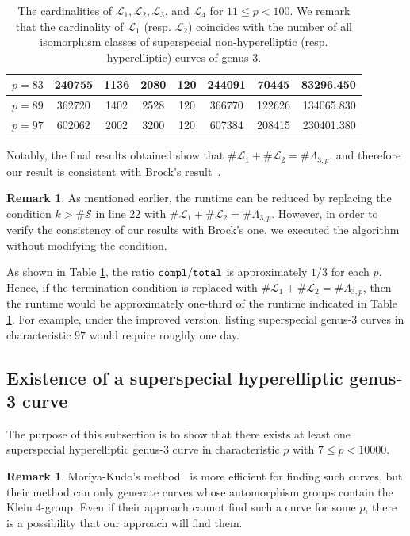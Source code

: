 \documentclass{amsart}
\theoremstyle{definition}
\newtheorem{Rmk}[Def]{Remark}
\theoremstyle{plain}
\begin{document}
\begin{table}[htbp]
\begin{tabular}{c||c|c|c|c||c|c||r}
    $p=83$ & 240755 & 1136 & 2080 & 120 & 244091&  70445 & 83296.450\\\hline
    $p=89$ & 362720 & 1402 & 2528 & 120 & 366770 & 122626 & 134065.830\\\hline
    $p=97$ & 602062 & 2002 & 3200 & 120 & 607384 & 208415 & 230401.380
    \end{tabular}\vspace{3mm}
    \caption{The cardinalities of $\mathcal{L}_1,\mathcal{L}_2,\mathcal{L}_3$, and $\mathcal{L}_4$ for $11 \leq p < 100$. We remark that the cardinality of $\mathcal{L}_1$ (resp. $\mathcal{L}_2$) coincides with the number of all isomorphism classes of superspecial non-hyperelliptic (resp. hyperelliptic) curves of genus 3.}\label{enumerate}
\end{table}

Notably, the final results obtained show that $\#\mathcal{L}_1 + \#\mathcal{L}_2 = \#\Lambda_{3,p}$, and therefore our result is consistent with Brock's result~\cite[Theorem 3.10]{Brock}.
\begin{Rmk}\label{later}
As mentioned earlier, the runtime can be reduced by replacing the condition $k > \#\mathcal{S}$ in line 22 with $\#\mathcal{L}_1 + \#\mathcal{L}_2 = \#\Lambda_{3,p}$.
However, in order to verify the consistency of our results with Brock's one, we executed the algorithm without modifying the condition.
\end{Rmk}

\noindent As shown in Table \ref{enumerate}, the ratio ${\tt compl}/{\tt total}$ is approximately $1/3$ for each $p$.
Hence, if the termination condition is replaced with  $\#\mathcal{L}_1 + \#\mathcal{L}_2 = \#\Lambda_{3,p}$, then the runtime would be approximately one-third of the runtime indicated in Table \ref{enumerate}.
For example, under the improved version, listing superspecial genus-3 curves in characteristic $97$ would require roughly one day.

\subsection{Existence of a superspecial hyperelliptic genus-3 curve}\label{existence}
The purpose of this subsection is to show that there exists at least one superspecial hyperelliptic genus-3 curve in characteristic $p$ with $7 \leq p < 10000$.
\begin{Rmk}
Moriya-Kudo's method~\cite{MK} is more efficient for finding such curves, but their method can only generate curves whose automorphism groups contain the Klein $4$-group.
Even if their approach cannot find such a curve for some $p$, there is a possibility that our approach will find them.
\end{Rmk}
\end{document}

